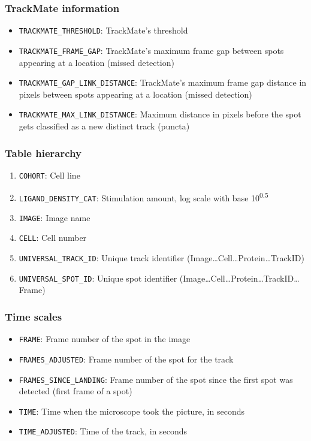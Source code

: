 \subsubsection{TrackMate information}
\begin{itemize}
\item \texttt{TRACKMATE\_THRESHOLD}: TrackMate's threshold
\item \texttt{TRACKMATE\_FRAME\_GAP}: TrackMate's maximum frame gap between spots appearing at a location (missed detection)
\item \texttt{TRACKMATE\_GAP\_LINK\_DISTANCE}: TrackMate's maximum frame gap distance in pixels between spots appearing at a location (missed detection)
\item \texttt{TRACKMATE\_MAX\_LINK\_DISTANCE}: Maximum distance in pixels before the spot gets classified as a new distinct track (puncta)
\end{itemize}

\subsubsection{Table hierarchy}
\begin{enumerate}
\item \texttt{COHORT}: Cell line
\item \texttt{LIGAND\_DENSITY\_CAT}: Stimulation amount, log scale with base 10\textsuperscript{0.5}
\item \texttt{IMAGE}: Image name
\item \texttt{CELL}: Cell number
\item \texttt{UNIVERSAL\_TRACK\_ID}: Unique track identifier (Image…Cell…Protein…TrackID)
\item \texttt{UNIVERSAL\_SPOT\_ID}: Unique spot identifier (Image…Cell…Protein…TrackID…Frame)
\end{enumerate}
\subsubsection{Time scales}
\begin{itemize}
\item \texttt{FRAME}: Frame number of the spot in the image
\item \texttt{FRAMES\_ADJUSTED}: Frame number of the spot for the track
\item \texttt{FRAMES\_SINCE\_LANDING}: Frame number of the spot since the first spot was detected (first frame of a spot)
\item \texttt{TIME}: Time when the microscope took the picture, in seconds
\item \texttt{TIME\_ADJUSTED}: Time of the track, in seconds
\end{itemize}

